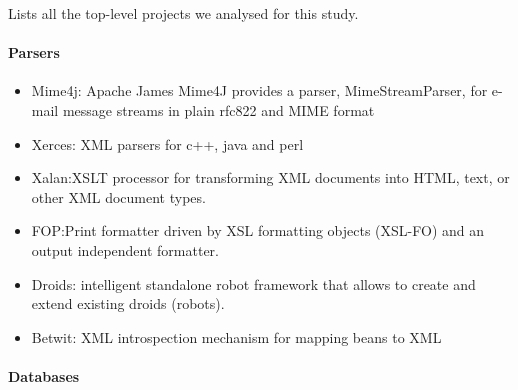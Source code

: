 \documentclass[natbib]{svjour3}
\providecommand{\tightlist}{%
  \setlength{\itemsep}{0pt}\setlength{\parskip}{0pt}}
\let\oldparagraph\paragraph
\renewcommand{\paragraph}[1]{\oldparagraph{#1}\mbox{}}
\begin{document}
Lists all the top-level projects we analysed for this study.

\footnotesize

\paragraph{Parsers}\label{parsers}

\begin{itemize}
\tightlist
\item
  Mime4j: Apache James Mime4J provides a parser, MimeStreamParser, for
  e-mail message streams in plain rfc822 and MIME format
\item
  Xerces: XML parsers for c++, java and perl
\item
  Xalan:XSLT processor for transforming XML documents into HTML, text,
  or other XML document types.
\item
  FOP:Print formatter driven by XSL formatting objects (XSL-FO) and an
  output independent formatter.
\item
  Droids: intelligent standalone robot framework that allows to create
  and extend existing droids (robots).
\item
  Betwit: XML introspection mechanism for mapping beans to XML
\end{itemize}

\paragraph{Databases}\label{databases}
\end{document}
